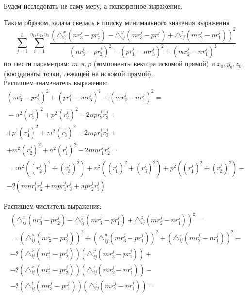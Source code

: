 Будем исследовать не саму меру, а подкоренное выражение.

Таким образом, задача свелась к поиску минимального значения выражения
$$\underset{j=1}{\overset{3}{\sum}} \underset{i=1}{\overset{n_1, n_2, n_3}{\sum}}
\frac{\left(\triangle_{ij}^x (n r_3^j - p r_2^j) - \triangle_{ij}^y (m r_3^j - p r_1^j) + \triangle_{ij}^z (m r_2^j - n r_1^j)\right)^2}{(n r_3^j - p r_2^j)^2 + (p r_1^j - m r_3^j)^2 + (m r_2^j - n r_1^j)^2}$$
по шести параметрам: $m,n,p$ (компоненты вектора искомой прямой) и $x_0, y_0, z_0$ (координаты точки, лежащей на искомой прямой).\\

Распишем знаменатель выражения:
$$\begin{gathered}
	(n r_3^j - p r_2^j)^2 + (p r_1^j - m r_3^j)^2 + (m r_2^j - n r_1^j)^2 = \\
	= n^2 (r_3^j)^2 + p^2 (r_2^j)^2 - 2 n p r_2^j r_3^j + \\
	+ p^2 (r_1^j)^2 + m^2 (r_3^j)^2 - 2 m p r_1^j r_3^j + \\
	+ m^2 (r_2^j)^2 + n^2 (r_1^j)^2 - 2 m n r_1^j r_2^j = \\
	= m^2 \left((r_2^j)^2 + (r_3^j)^2\right) + n^2 \left((r_1^j)^2 + (r_3^j)^2\right) + p^2 \left((r_1^j)^2 + (r_2^j)^2\right) - \\
	- 2 (m n r_1^j r_2^j + m p r_1^j r_3^j + n p r_2^j r_3^j)
\end{gathered}$$

Распишем числитель выражения:
$$\begin{gathered}
	\left(\triangle_{ij}^x (n r_3^j - p r_2^j) - \triangle_{ij}^y (m r_3^j - p r_1^j) + \triangle_{ij}^z (m r_2^j - n r_1^j)\right)^2 = \\
	= \left(\triangle_{ij}^x (n r_3^j - p r_2^j) \right)^2 + \left( \triangle_{ij}^y (m r_3^j - p r_1^j) \right)^2 + \left( \triangle_{ij}^z (m r_2^j - n r_1^j) \right)^2 - \\
	- 2 \left(\triangle_{ij}^x (n r_3^j - p r_2^j) \right)\left( \triangle_{ij}^y (m r_3^j - p r_1^j) \right) + \\
	+ 2 \left(\triangle_{ij}^x (n r_3^j - p r_2^j) \right) \left( \triangle_{ij}^z (m r_2^j - n r_1^j) \right) - \\
	- 2\left( \triangle_{ij}^y (m r_3^j - p r_1^j) \right)\left( \triangle_{ij}^z (m r_2^j - n r_1^j) \right) =
\end{gathered}$$

